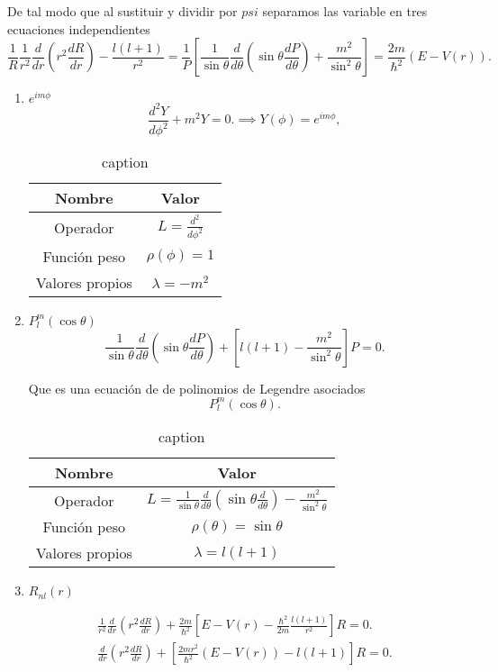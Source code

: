 \documentclass{report}
\begin{document}
De tal modo que al sustituir y dividir por $psi$ separamos las variable en tres ecuaciones independientes
\[
\frac{1}{R} \frac{1}{r^2} \frac{d}{dr} \left( r^2 \frac{dR}{dr} \right) - \frac{l(l+1)}{r^2} = \frac{1}{P} \left[ \frac{1}{\sin\theta} \frac{d}{d\theta} \left( \sin\theta \frac{dP}{d\theta} \right) + \frac{m^2}{\sin^2\theta} \right] = \frac{2m}{\hbar^2} \left( E - V(r) \right).
\]
\begin{enumerate}
  \item \( e^{im\phi} \)
\[
\frac{d^2 Y}{d\phi^2} + m^2 Y = 0. \implies Y(\phi) = e^{im\phi},
\]
\begin{table}[H]
  \centering
  \caption{caption}
  \label{tab:label}
  \begin{tabular}{c|c}
    \hline
    Nombre & Valor\\
    \hline
    Operador & \( L = \frac{d^2}{d\phi^2} \) \\
    Función peso & \( \rho(\phi) = 1 \) \\
    Valores propios & \( \lambda = -m^2 \)\\
    \hline
  \end{tabular}
\end{table}

\item \( P_l^m(\cos\theta) \)
\[
\frac{1}{\sin\theta} \frac{d}{d\theta} \left( \sin\theta \frac{dP}{d\theta} \right) + \left[ l(l+1) - \frac{m^2}{\sin^2\theta} \right] P = 0.
\]

Que es una ecuación de de polinomios de Legendre asociados
\[
P_l^m(\cos\theta).
\]

\begin{table}[H]
  \centering
  \caption{caption}
  \label{tab:label}
  \begin{tabular}{c|c}
    \hline
    Nombre & Valor\\
    \hline
    Operador & \( L = \frac{1}{\sin\theta} \frac{d}{d\theta} \left( \sin\theta \frac{d}{d\theta} \right) - \frac{m^2}{\sin^2\theta} \) \\
    Función peso & \( \rho(\theta) = \sin\theta \)\\
    Valores propios & \( \lambda = l(l+1) \) \\
    \hline
  \end{tabular}
\end{table}

\item \( R_{nl}(r) \)

  \begin{align*}
\frac{1}{r^2} \frac{d}{dr} \left( r^2 \frac{dR}{dr} \right) + \frac{2m}{\hbar^2} \left[ E - V(r) - \frac{\hbar^2}{2m} \frac{l(l+1)}{r^2} \right] R = 0.\\
\frac{d}{dr} \left( r^2 \frac{dR}{dr} \right) + \left[ \frac{2mr^2}{\hbar^2} (E - V(r)) - l(l+1) \right] R = 0.
  \end{align*}


\end{enumerate}
\end{document}
